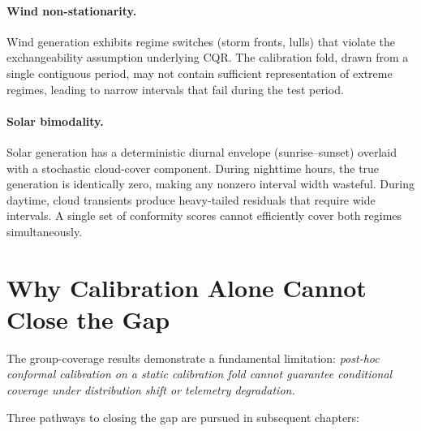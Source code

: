 \paragraph{Wind non-stationarity.}
Wind generation exhibits regime switches (storm fronts, lulls) that
violate the exchangeability assumption underlying CQR.  The calibration
fold, drawn from a single contiguous period, may not contain sufficient
representation of extreme regimes, leading to narrow intervals that
fail during the test period.

\paragraph{Solar bimodality.}
Solar generation has a deterministic diurnal envelope (sunrise--sunset)
overlaid with a stochastic cloud-cover component.  During nighttime hours,
the true generation is identically zero, making any nonzero interval
width wasteful.  During daytime, cloud transients produce heavy-tailed
residuals that require wide intervals.  A single set of conformity
scores cannot efficiently cover both regimes simultaneously.

\section{Why Calibration Alone Cannot Close the Gap}

The group-coverage results demonstrate a fundamental limitation:
\emph{post-hoc conformal calibration on a static calibration fold cannot
guarantee conditional coverage under distribution shift or telemetry
degradation.}

Three pathways to closing the gap are pursued in subsequent chapters:

